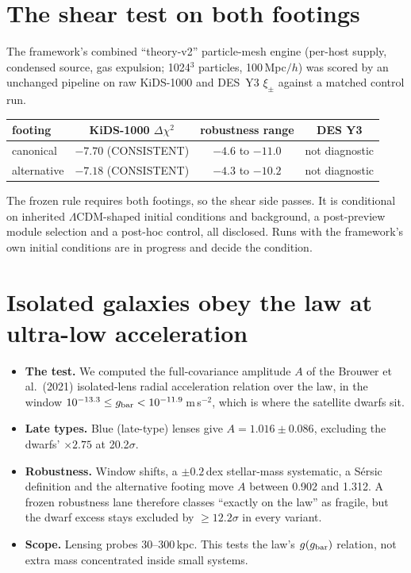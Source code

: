 \documentclass[10pt]{article}
\begin{document}
\section{The shear test on both footings}
The framework's combined ``theory-v2'' particle-mesh engine (per-host supply, condensed source, gas expulsion; 1024$^3$ particles, 100\,Mpc$/h$) was scored by an unchanged pipeline on raw KiDS-1000 and DES~Y3 $\xi_\pm$ against a matched control run.
\begin{center}
\begin{tabular}{lccc}
\toprule
footing & KiDS-1000 $\Delta\chi^2$ & robustness range & DES Y3\\
\midrule
canonical & $-7.70$ (CONSISTENT) & $-4.6$ to $-11.0$ & not diagnostic\\
alternative & $-7.18$ (CONSISTENT) & $-4.3$ to $-10.2$ & not diagnostic\\
\bottomrule
\end{tabular}
\end{center}
The frozen rule requires both footings, so the shear side passes. It is conditional on inherited $\Lambda$CDM-shaped initial conditions and background, a post-preview module selection and a post-hoc control, all disclosed. Runs with the framework's own initial conditions are in progress and decide the condition.

\section{Isolated galaxies obey the law at ultra-low acceleration}
\begin{itemize}
\item \textbf{The test.} We computed the full-covariance amplitude $A$ of the Brouwer et al.\ (2021) isolated-lens radial acceleration relation over the law, in the window $10^{-13.3}\le g_{\rm bar}<10^{-11.9}$\,m\,s$^{-2}$, which is where the satellite dwarfs sit.
\item \textbf{Late types.} Blue (late-type) lenses give $A=1.016\pm0.086$, excluding the dwarfs' $\times2.75$ at 20.2$\sigma$.
\item \textbf{Robustness.} Window shifts, a $\pm0.2$\,dex stellar-mass systematic, a S\'ersic definition and the alternative footing move $A$ between 0.902 and 1.312. A frozen robustness lane therefore classes ``exactly on the law'' as fragile, but the dwarf excess stays excluded by $\ge12.2\sigma$ in every variant.
\item \textbf{Scope.} Lensing probes 30--300\,kpc. This tests the law's $g(g_{\rm bar})$ relation, not extra mass concentrated inside small systems.
\end{itemize}
\end{document}
